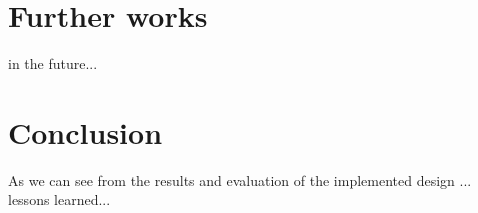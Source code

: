 \documentclass[12pt, a4paper, oneside]{article}
\begin{document}
\section{Further works}
in the future...

\section{Conclusion}
As we can see from the results and evaluation of the implemented design ...
lessons learned...

\newpage




\end{document}
